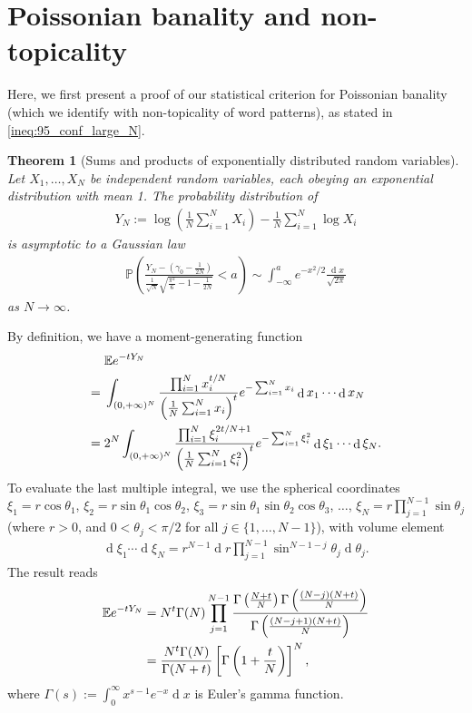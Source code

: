 \documentclass[10pt,journal,compsoc]{IEEEtran}
\newtheorem{theorem}{Theorem}
\DeclareMathOperator{\D}{d}
\begin{document}
\section{ Poissonian banality and non-topicality\label{app:two-sigma_Poisson}}
Here, we first present a proof of our statistical criterion for Poissonian banality (which we identify with non-topicality of word patterns), as stated in \eqref{ineq:95_conf_large_N}.
\begin{theorem}[Sums and products of exponentially distributed random variables]\label{thm:YN_dist}Let $ X_1,\dots,X_N$ be independent random variables, each obeying an exponential distribution with mean 1.  The probability distribution of
\begin{align} Y_N:=\log\left(\frac{1}{N}\sum_{i=1}^NX_i\right)-\frac{1}{N}\sum_{i=1}^N\log X_i\end{align}is asymptotic to a Gaussian law\begin{align}\mathbb P\left( \frac{Y_N-\left( \gamma_0-\frac{1}{2N} \right)}{\frac{1}{\sqrt{N}}\sqrt{\frac{\pi^2}{6}-1-\frac{1}{2N}}}<a\right)\sim\int_{-\infty}^ae^{-{x^2}/{2}}\frac{\D x}{\sqrt{2\pi}}\label{eq:central_limit}
\end{align}as $ N\to\infty$.\end{theorem}\begin{IEEEproof}By definition, we have a moment-generating function \begin{align}&
\mathbb E e^{-t Y_N}\notag\\={}&\int_{(0,+\infty)^N}\frac{\prod_{i=1}^Nx_i^{t/N}}{\left(\frac{1}{N}\sum_{i=1}^Nx_i\right)^t}e^{-\sum_{i=1}^Nx_i}\D x_1\cdots \D x_N\notag\\={}&2^N\int_{(0,+\infty)^N}\frac{\prod_{i=1}^N\xi_i^{2t/N+1}}{\left(\frac{1}{N}\sum^N_{i=1}\xi_{i}^{2}\right)^t}e^{-\sum^N_{i=1}\xi_{i}^{2}}\D \xi_{1}\cdots\D \xi_{N}.
\end{align}To evaluate the last multiple integral, we use  the spherical coordinates $ \xi_1=r\cos\theta_1$, $ \xi_2=r\sin\theta_1\cos\theta_2$, $ \xi_3=r\sin\theta _1\sin\theta_2\cos\theta_3$, $ \dots$, $ \xi_N=r\prod_{j=1}^{N-1}\sin \theta_j$ (where $ r>0$, and $ 0<\theta_j<\pi/2$ for all $ j\in\{1,\dots, N-1\}$), with volume element \begin{align} \D \xi_{1}\cdots\D \xi_{N}=r^{N-1}\D r\prod_{j=1}^{N-1}\sin^{N-1-j} \theta_j\D\theta_j.\end{align} The result reads\begin{align}
\mathbb E e^{-t Y_N}={}&N^{t}\Gamma(N)\prod_{j=1}^{N-1}\frac{\Gamma\left(\frac{N+t}{N}\right)\Gamma\left(\frac{(N-j)(N+t)}{N}\right)}{\Gamma\left(\frac{(N-j+1)(N+t)}{N}\right)}\notag \\={}& \frac{N^{t}\Gamma(N)}{\Gamma(N+t)}\left[ \Gamma\left( 1+\frac{t}{N} \right) \right]^N,\label{eq:Y_N_Lap}\end{align}where $ \Gamma(s):=\int_0^\infty x^{s-1}e^{-x}\D x$ is Euler's gamma function.


\end{IEEEproof}
\end{document}
